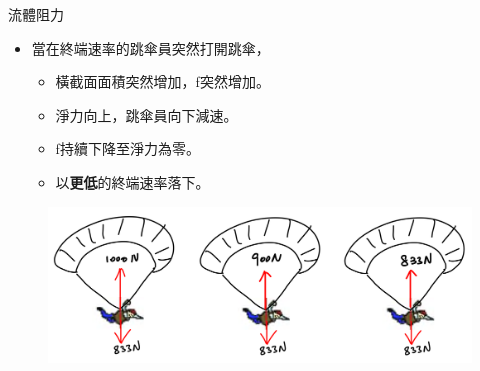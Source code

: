 \documentclass[beamer=true]{standalone}
\begin{document}
\begin{frame}{流體阻力}
    \begin{itemize}
        \item 當在終端速率的跳傘員突然打開跳傘，
              \begin{itemize}
                  \item 橫截面面積突然增加，f突然增加。
                  \item 淨力向上，跳傘員向下減速。
                  \item f持續下降至淨力為零。
                  \item 以\textbf{更低}的終端速率落下。
              \end{itemize}
    \end{itemize}

    \begin{figure}[h!]
        \centering
        \includegraphics[width=.55\textwidth]{assets/bacb418f.png}
    \end{figure}

\end{frame}
\end{document}
